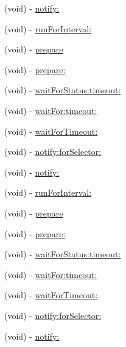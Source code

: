 \begin{DoxyCompactItemize}
\item 
(void) -\/ \hyperlink{interface_g_h_async_test_case_ad21d6cdd1f2a284ee7b5ad5b6d1c82e2}{notify\-:}
\item 
(void) -\/ \hyperlink{interface_g_h_async_test_case_accbc972d3d516d1e53529c84fa2fc510}{run\-For\-Interval\-:}
\item 
(void) -\/ \hyperlink{interface_g_h_async_test_case_a8eda5b64c599e0c48bbd206840bd4cde}{prepare}
\item 
(void) -\/ \hyperlink{interface_g_h_async_test_case_a085b47a16f4a790d77ba78bd2eafb3ff}{prepare\-:}
\item 
(void) -\/ \hyperlink{interface_g_h_async_test_case_ae8781529003ebef3a06569c0157687ae}{wait\-For\-Status\-:timeout\-:}
\item 
(void) -\/ \hyperlink{interface_g_h_async_test_case_a43422127c8303a93f0ae39c883a2da06}{wait\-For\-:timeout\-:}
\item 
(void) -\/ \hyperlink{interface_g_h_async_test_case_aaf22dd45b3493e110362392cc3dc086b}{wait\-For\-Timeout\-:}
\item 
(void) -\/ \hyperlink{interface_g_h_async_test_case_ab1be43eb4f4909ce5607b51fa0a1f40b}{notify\-:for\-Selector\-:}
\item 
(void) -\/ \hyperlink{interface_g_h_async_test_case_ad21d6cdd1f2a284ee7b5ad5b6d1c82e2}{notify\-:}
\item 
(void) -\/ \hyperlink{interface_g_h_async_test_case_accbc972d3d516d1e53529c84fa2fc510}{run\-For\-Interval\-:}
\item 
(void) -\/ \hyperlink{interface_g_h_async_test_case_a8eda5b64c599e0c48bbd206840bd4cde}{prepare}
\item 
(void) -\/ \hyperlink{interface_g_h_async_test_case_a085b47a16f4a790d77ba78bd2eafb3ff}{prepare\-:}
\item 
(void) -\/ \hyperlink{interface_g_h_async_test_case_ae8781529003ebef3a06569c0157687ae}{wait\-For\-Status\-:timeout\-:}
\item 
(void) -\/ \hyperlink{interface_g_h_async_test_case_a43422127c8303a93f0ae39c883a2da06}{wait\-For\-:timeout\-:}
\item 
(void) -\/ \hyperlink{interface_g_h_async_test_case_aaf22dd45b3493e110362392cc3dc086b}{wait\-For\-Timeout\-:}
\item 
(void) -\/ \hyperlink{interface_g_h_async_test_case_ab1be43eb4f4909ce5607b51fa0a1f40b}{notify\-:for\-Selector\-:}
\item 
(void) -\/ \hyperlink{interface_g_h_async_test_case_ad21d6cdd1f2a284ee7b5ad5b6d1c82e2}{notify\-:}

\end{DoxyCompactItemize}
